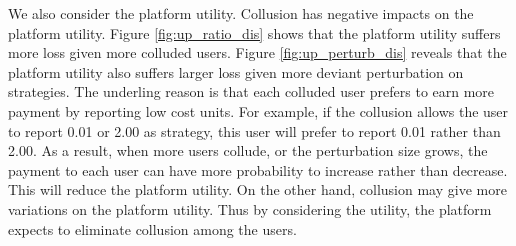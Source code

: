 \documentclass[conference]{IEEEtran}
\theoremstyle{definition}
\begin{document}
We also consider the platform utility. %
Collusion has negative impacts on the platform utility. Figure \ref{fig:up_ratio_dis} shows that the platform utility suffers more loss given more colluded users. Figure \ref{fig:up_perturb_dis} reveals that the platform utility also suffers larger loss given more deviant perturbation on strategies. The underling reason is that each colluded user prefers to earn more payment by reporting low cost units. For example, if the collusion allows the user to report 0.01 or 2.00 as strategy, this user will prefer to report 0.01 rather than 2.00. As a result, when more users collude, or the perturbation size grows, the payment to each user can have more probability to increase rather than decrease. This will reduce the platform utility. On the other hand, collusion may give more variations on the platform utility. Thus by considering the utility, the platform expects to eliminate {\color{black}collusion among the users}.
\end{document}

